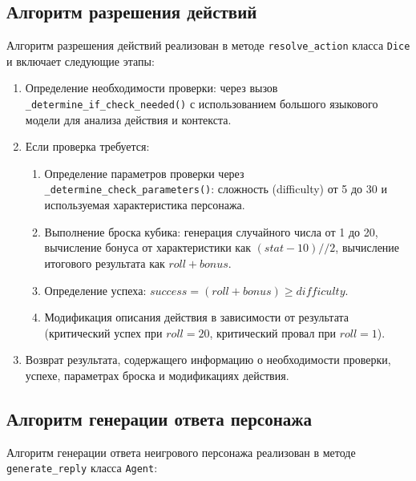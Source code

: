 \subsection{Алгоритм разрешения действий}

Алгоритм разрешения действий реализован в методе \texttt{resolve\_action} класса \texttt{Dice} и включает следующие этапы:

\begin{enumerate}
	\item Определение необходимости проверки: через вызов \texttt{\_determine\_if\_check\_needed()} с использованием большого языкового модели для анализа действия и контекста.
	
	\item Если проверка требуется:
	\begin{enumerate}
		\item Определение параметров проверки через \texttt{\_determine\_check\_parameters()}: сложность (difficulty) от 5 до 30 и используемая характеристика персонажа.
		
		\item Выполнение броска кубика: генерация случайного числа от 1 до 20, вычисление бонуса от характеристики как $(stat - 10) // 2$, вычисление итогового результата как $roll + bonus$.
		
		\item Определение успеха: $success = (roll + bonus) \geq difficulty$.
		
		\item Модификация описания действия в зависимости от результата (критический успех при $roll = 20$, критический провал при $roll = 1$).
	\end{enumerate}
	
	\item Возврат результата, содержащего информацию о необходимости проверки, успехе, параметрах броска и модификациях действия.
\end{enumerate}

\subsection{Алгоритм генерации ответа персонажа}

Алгоритм генерации ответа неигрового персонажа реализован в методе \texttt{generate\_reply} класса \texttt{Agent}:

